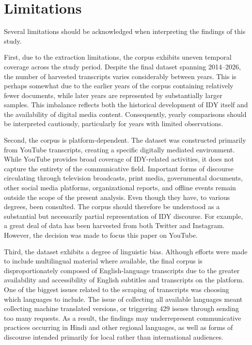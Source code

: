 \documentclass[11pt]{article}
\begin{document}
{\section{Limitations}

Several limitations should be acknowledged when interpreting the findings of this study.

First, due to the extraction limitations, the corpus exhibits uneven temporal coverage across the study period. Despite the final dataset spanning 2014--2026, the number of harvested transcripts varies considerably between years. This is perhaps somewhat due to the earlier years of the corpus containing relatively fewer documents, while later years are represented by substantially larger samples. This imbalance reflects both the historical development of IDY itself and the availability of digital media content. Consequently, yearly comparisons should be interpreted cautiously, particularly for years with limited observations.

Second, the corpus is platform-dependent. The dataset was constructed primarily from YouTube transcripts, creating a specific digitally mediated environment. While YouTube provides broad coverage of IDY-related activities, it does not capture the entirety of the communicative field. Important forms of discourse circulating through television broadcasts, print media, governmental documents, other social media platforms, organizational reports, and offline events remain outside the scope of the present analysis. Even though they have, to various degrees, been consulted. The corpus should therefore be understood as a substantial but necessarily partial representation of IDY discourse. For example, a great deal of data has been harvested from both Twitter and Instagram. However, the decision was made to focus this paper on YouTube.

Third, the dataset exhibits a degree of linguistic bias. Although efforts were made to include multilingual material where available, the final corpus is disproportionately composed of English-language transcripts due to the greater availability and accessibility of English subtitles and transcripts on the platform. One of the biggest issues related to the scraping of transcripts was choosing which languages to include. The issue of collecting all available languages meant collecting machine translated versions, or triggering 429 issues through sending too many requests. As a result, the findings may underrepresent communicative practices occurring in Hindi and other regional languages, as well as forms of discourse intended primarily for local rather than international audiences.

}
\end{document}
